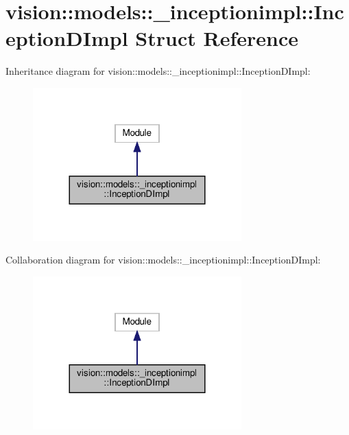 \hypertarget{structvision_1_1models_1_1__inceptionimpl_1_1InceptionDImpl}{}\section{vision\+:\+:models\+:\+:\+\_\+inceptionimpl\+:\+:Inception\+D\+Impl Struct Reference}
\label{structvision_1_1models_1_1__inceptionimpl_1_1InceptionDImpl}


Inheritance diagram for vision\+:\+:models\+:\+:\+\_\+inceptionimpl\+:\+:Inception\+D\+Impl\+:
\nopagebreak
\begin{figure}[H]
\begin{center}
\leavevmode
\includegraphics[width=228pt]{structvision_1_1models_1_1__inceptionimpl_1_1InceptionDImpl__inherit__graph}
\end{center}
\end{figure}


Collaboration diagram for vision\+:\+:models\+:\+:\+\_\+inceptionimpl\+:\+:Inception\+D\+Impl\+:
\nopagebreak
\begin{figure}[H]
\begin{center}
\leavevmode
\includegraphics[width=228pt]{structvision_1_1models_1_1__inceptionimpl_1_1InceptionDImpl__coll__graph}
\end{center}
\end{figure}
